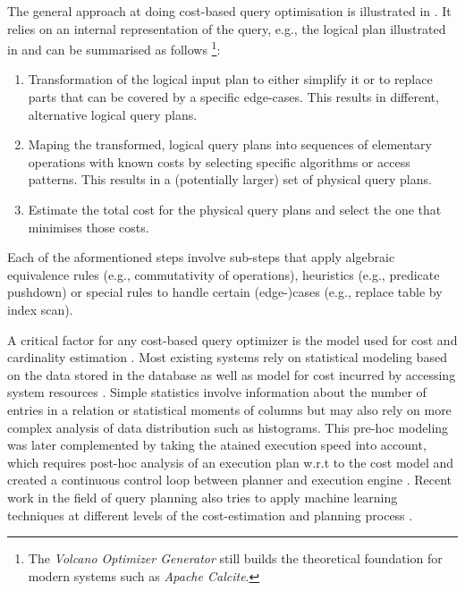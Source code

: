 The general approach at doing cost-based query optimisation is illustrated in . It relies on an internal representation of the query, e.g., the logical plan illustrated in  and can be summarised as follows \cite{Jarke:1984Query,Graefe:1993Volcano} \footnote{The \emph{Volcano Optimizer Generator} \cite{Graefe:1993Volcano} still builds the theoretical foundation for modern systems such as \emph{Apache Calcite}.}:

\begin{enumerate}
    \item Transformation of the logical input plan to either simplify it or to replace parts that can be covered by a specific edge-cases. This results in different, alternative logical query plans.
    \item Maping the transformed, logical query plans into sequences of elementary operations with known costs by selecting specific algorithms or access patterns. This results in a (potentially larger) set of physical query plans.
    \item Estimate the total cost for the physical query plans and select the one that minimises those costs.
\end{enumerate}

Each of the aformentioned steps involve sub-steps that apply algebraic equivalence rules \cite{Garcia:2009Database}  (e.g., commutativity of operations), heuristics \cite{Garcia:2009Database,Graefe:1993Query,Swami:1989Optimization,Bruno:2010Polynomial,Tsialiamanis:2012Heuristics,} (e.g., predicate pushdown) or special rules to handle certain (edge-)cases \cite{Jarke:1984Query,Graefe:1993Query} (e.g., replace table by index scan).

A critical factor for any cost-based query optimizer is the model used for cost and cardinality estimation \cite{Jarke:1984Query,Yin:2015Robust}. Most existing systems rely on statistical modeling based on the data stored in the database \cite{Getoor:2001Selectivity,Ioannidis:2003History} as well as model for cost incurred by accessing system resources \cite{Manegold:2002Generic}. Simple statistics involve information about the number of entries in a relation or statistical moments of columns but may also rely on more complex analysis of data distribution such as histograms. This pre-hoc modeling was later complemented by taking the atained execution speed into account, which requires post-hoc analysis of an execution plan w.r.t to the cost model and created a continuous control loop between planner and execution engine \cite{Mackert:1986R}. Recent work in the field of query planning also tries to apply machine learning techniques at different levels of the cost-estimation and planning process \cite{Wu:2013Predicting,Vu:2019Deep}.

